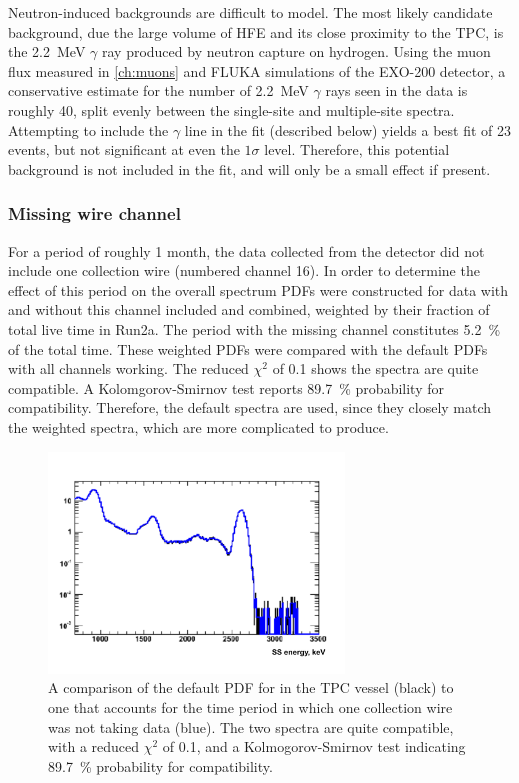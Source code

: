 \documentclass[herrin-thesis.tex]{subfiles}
\begin{document}
Neutron-induced backgrounds are difficult to model. The most likely candidate background, due the large volume of HFE and its close proximity to the TPC, is the \SI{2.2}{\MeV} \(\gamma\) ray produced by neutron capture on hydrogen. Using the muon flux measured in \cref{ch:muons} and FLUKA \cite{Ferrari:2005zk} simulations of the EXO-200 detector, a conservative estimate for the number of \SI{2.2}{\MeV} \(\gamma\) rays seen in the data is roughly 40, split evenly between the single-site and multiple-site spectra. Attempting to include the \(\gamma\) line in the fit (described below) yields a best fit of 23 events, but not significant at even the \(1\sigma\) level. Therefore, this potential background is not included in the fit, and will only be a small effect if present.

\subsubsection{Missing wire channel}
For a period of roughly 1 month, the data collected from the detector did not include one collection wire (numbered channel 16). In order to determine the effect of this period on the overall spectrum PDFs were constructed for data with and without this channel included and combined, weighted by their fraction of total live time in Run2a. The period with the missing channel constitutes \SI{5.2}{\percent} of the total time. These weighted PDFs were compared with the default PDFs with all channels working. The reduced \(\chi^2\) of 0.1 shows the spectra are quite compatible. A Kolomgorov-Smirnov test reports \SI{89.7}{\percent} probability for compatibility. Therefore, the default spectra are used, since they closely match the weighted spectra, which are more complicated to produce.

\begin{figure}[htbp]
\centering
\includegraphics[width=0.7\textwidth]{./plots/analysis_missing_channel16_comparison.pdf}
\caption[Comparison of default PDF to PDF with missing channel]{A comparison of the default PDF for  in the TPC vessel (black) to one that accounts for the time period in which one collection wire was not taking data (blue). The two spectra are quite compatible, with a reduced \(\chi^2\) of 0.1, and a Kolmogorov-Smirnov test indicating \SI{89.7}{\percent} probability for compatibility.}
\label{fig:analysis_missing_channel16_comparison}
\end{figure}
\end{document}
